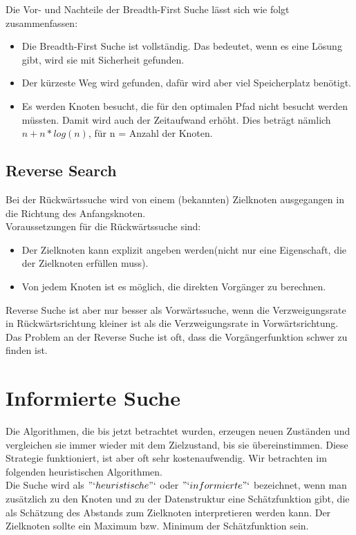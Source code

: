 Die Vor- und Nachteile der Breadth-First Suche lässt sich wie folgt zusammenfassen:

\begin{itemize}
  \item Die Breadth-First Suche ist vollständig. Das bedeutet, wenn es eine Lösung gibt, wird sie mit Sicherheit gefunden.
  \item Der kürzeste Weg wird gefunden, dafür wird aber viel Speicherplatz benötigt.
  \item Es werden Knoten besucht, die für den optimalen Pfad nicht besucht werden müssten. Damit wird auch der Zeitaufwand erhöht. Dies beträgt nämlich $n+n*log(n)$, für n = Anzahl der Knoten.
\end{itemize}

\subsection{Reverse Search}
\bigskip
Bei der Rückwärtssuche wird von einem (bekannten) Zielknoten ausgegangen in die Richtung des Anfangsknoten.\\

Voraussetzungen für die Rückwärtssuche sind:

\begin{itemize}
  \item Der Zielknoten kann explizit angeben werden(nicht nur eine Eigenschaft, die der Zielknoten erfüllen muss).
  \item Von jedem Knoten ist es möglich, die direkten Vorgänger zu berechnen.
\end{itemize}

Reverse Suche ist aber nur besser als Vorwärtssuche, wenn die Verzweigungsrate in Rückwärtsrichtung kleiner ist als die Verzweigungsrate in Vorwärtsrichtung. Das Problem an der Reverse Suche ist oft, dass die Vorgängerfunktion schwer zu finden ist.

\section{Informierte Suche}

Die Algorithmen, die bis jetzt betrachtet wurden, erzeugen neuen Zuständen und vergleichen sie immer wieder mit dem Zielzustand, bis sie übereinstimmen. Diese Strategie funktioniert, ist aber oft sehr kostenaufwendig. Wir betrachten im folgenden heuristischen Algorithmen.\\

Die Suche wird als $"`heuristische"`$ oder $"`informierte"`$ bezeichnet, wenn man zusätzlich zu den Knoten und zu der Datenstruktur eine Schätzfunktion gibt, die als Schätzung des Abstands zum Zielknoten interpretieren werden kann. Der Zielknoten sollte ein Maximum bzw. Minimum der Schätzfunktion sein.\\

